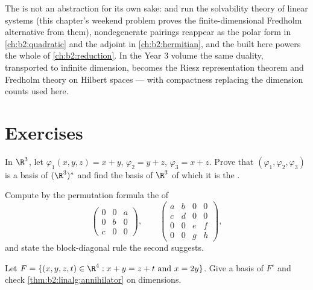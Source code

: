 \begin{remark}
The  is not an abstraction for its own sake: 
and  run the solvability theory of linear systems (this
chapter's weekend problem proves the finite-dimensional Fredholm
alternative from them), nondegenerate pairings reappear as the
polar form in \cref{ch:b2:quadratic} and the adjoint in
\cref{ch:b2:hermitian}, and the  built here powers the
whole of \cref{ch:b2:reduction}. In the Year 3 volume the same
duality, transported to infinite dimension, becomes the
Riesz representation theorem and Fredholm theory on Hilbert
spaces --- with compactness replacing the dimension counts used
here.
\end{remark}

\section{Exercises}

\begin{exercise}[$\star$]\label{exo:b2:linalg:1}
In $\R^3$, let $\varphi_1(x,y,z) = x + y$, $\varphi_2 = y + z$,
$\varphi_3 = x + z$. Prove that $(\varphi_1, \varphi_2, \varphi_3)$
is a basis of $(\R^3)^*$ and find the basis of $\R^3$ of which it is
the .
\end{exercise}

\begin{exercise}[$\star$]\label{exo:b2:linalg:2}
Compute by the permutation formula the  of
\[
\begin{pmatrix} 0 & 0 & a\\ 0 & b & 0\\ c & 0 & 0 \end{pmatrix},
\qquad
\begin{pmatrix}
a & b & 0 & 0\\
c & d & 0 & 0\\
0 & 0 & e & f\\
0 & 0 & g & h
\end{pmatrix},
\]
and state the block-diagonal rule the second suggests.
\end{exercise}

\begin{exercise}[$\star$]\label{exo:b2:linalg:3}
Let $F = \{(x,y,z,t) \in \R^4 : x + y = z + t \text{ and } x = 2y\}$.
Give a basis of $F^\circ$ and check
\cref{thm:b2:linalg:annihilator} on dimensions.
\end{exercise}

